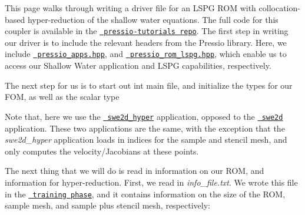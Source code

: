 This page walks through writing a driver file for an L\+S\+PG R\+OM with collocation-\/based hyper-\/reduction of the shallow water equations. The full code for this coupler is available in the \href{https://github.com/Pressio/pressio-tutorials/blob/swe2d_tutorial/tutorials/swe2d/online_phase/lspg_hyperReducedRom/run_lspg_with_hyperreduction.cc}{\texttt{ pressio-\/tutorials repo}}. The first step in writing our driver is to include the relevant headers from the Pressio library. Here, we include \href{https://github.com/Pressio/pressio/blob/master/packages/pressio_apps.hpp}{\texttt{ pressio\+\_\+apps.\+hpp}}, and \href{https://github.com/Pressio/pressio/blob/master/packages/pressio_lspg.hpp}{\texttt{ pressio\+\_\+rom\+\_\+lspg.\+hpp}}, which enable us to access our Shallow Water application and L\+S\+PG capabilities, respectively.


\begin{DoxyCode}{0}
\end{DoxyCode}


The next step for us is to start out int main file, and initialize the types for our F\+OM, as well as the scalar type 
\begin{DoxyCode}{0}
\end{DoxyCode}


Note that, here we use the \href{.}{\texttt{ swe2d\+\_\+hyper}} application, opposed to the \href{.}{\texttt{ swe2d}} application. These two applications are the same, with the exception that the {\itshape swe2d\+\_\+hyper} application loads in indices for the sample and stencil mesh, and only computes the velocity/\+Jacobians at these points.

The next thing that we will do is read in information on our R\+OM, and information for hyper-\/reduction. First, we read in {\itshape info\+\_\+file.\+txt}. We wrote this file in the \href{.}{\texttt{ training phase}}, and it contains information on the size of the R\+OM, sample mesh, and sample plus stencil mesh, respectively\+: 
\begin{DoxyCode}{0}
\end{DoxyCode}


